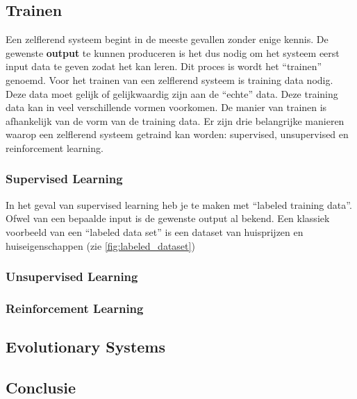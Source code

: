 \subsection{Trainen}
Een zelflerend systeem begint in de meeste gevallen zonder enige kennis. De gewenste \textbf{output} te kunnen produceren is het dus nodig om het systeem eerst input data te geven zodat het kan leren. Dit proces is wordt het “trainen” genoemd. Voor het trainen van een zelflerend systeem is training data nodig. Deze data moet gelijk of gelijkwaardig zijn aan de “echte” data. Deze training data kan in veel verschillende vormen voorkomen. De manier van trainen is afhankelijk van de vorm van de training data. Er zijn drie belangrijke manieren waarop een zelflerend systeem getraind kan worden: supervised, unsupervised en reinforcement learning.

\subsubsection{Supervised Learning}
In het geval van supervised learning heb je te maken met “labeled training data”. Ofwel van een bepaalde input is de gewenste output al bekend. Een klassiek voorbeeld van een “labeled data set” is een dataset van huisprijzen en huiseigenschappen (zie \ref{fig:labeled_dataset})
\label{fig:labeled_dataset}


\subsubsection{Unsupervised Learning}

\subsubsection{Reinforcement Learning}





\subsection{Evolutionary Systems}

\subsection{Conclusie}




